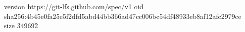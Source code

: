 version https://git-lfs.github.com/spec/v1
oid sha256:4b45e0fa25e5f2dfd5abd44bb366ad47cc006bc54df48933eb8af12afc2979ce
size 349692
